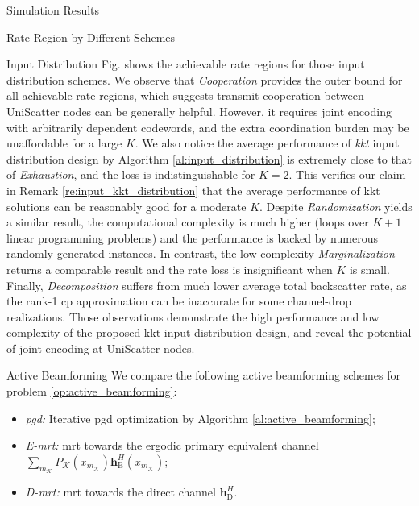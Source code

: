 \documentclass[journal]{IEEEtran}
\begin{document}
\begin{section}{Simulation Results}
\begin{subsection}{Rate Region by Different Schemes}
\begin{subsubsection}{Input Distribution}
			Fig.  shows the achievable rate regions for those input distribution schemes.
			We observe that \emph{Cooperation} provides the outer bound for all achievable rate regions, which suggests transmit cooperation between UniScatter nodes can be generally helpful.
			However, it requires joint encoding with arbitrarily dependent codewords, and the extra coordination burden may be unaffordable for a large $K$.
			We also notice the average performance of \emph{\gls{kkt}} input distribution design by Algorithm \ref{al:input_distribution} is extremely close to that of \emph{Exhaustion}, and the loss is indistinguishable for $K=2$.
			This verifies our claim in Remark \ref{re:input_kkt_distribution} that the average performance of \gls{kkt} solutions can be reasonably good for a moderate $K$.
			Despite \emph{Randomization} yields a similar result, the computational complexity is much higher (loops over $K+1$ linear programming problems) and the performance is backed by numerous randomly generated instances.
			In contrast, the low-complexity \emph{Marginalization} returns a comparable result and the rate loss is insignificant when $K$ is small.
			Finally, \emph{Decomposition} suffers from much lower average total backscatter rate, as the rank-\num{1} \gls{cp} approximation can be inaccurate for some channel-drop realizations.
			Those observations demonstrate the high performance and low complexity of the proposed \gls{kkt} input distribution design, and reveal the potential of joint encoding at UniScatter nodes.
		\end{subsubsection}


		\begin{subsubsection}{Active Beamforming}
			We compare the following active beamforming schemes for problem \eqref{op:active_beamforming}:
			\begin{itemize}
				\item \emph{\gls{pgd}:} Iterative \gls{pgd} optimization by Algorithm \ref{al:active_beamforming};
				\item \emph{E-\gls{mrt}:} \gls{mrt} towards the ergodic primary equivalent channel $\sum_{m_{\mathcal{K}}} P_{\mathcal{K}}(x_{m_{\mathcal{K}}}) \boldsymbol{h}_{\mathrm{E}}^H(x_{m_{\mathcal{K}}})$;
				\item \emph{D-\gls{mrt}:} \gls{mrt} towards the direct channel $\boldsymbol{h}_{\mathrm{D}}^H$.
			\end{itemize}


\end{subsubsection}
\end{subsection}
\end{section}
\end{document}
